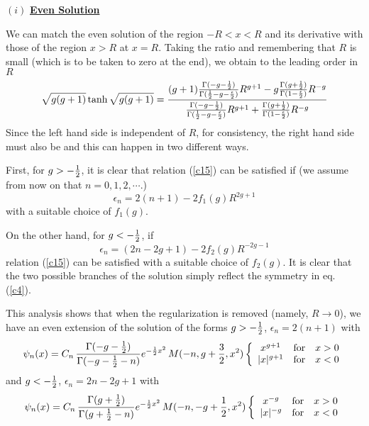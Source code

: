 \documentclass[a4paper,11pt]{article}
\begin{document}
\noindent$(i)$ {\bf\underline{Even Solution}}

We can match the even solution of the region $-R<x<R$ and its
derivative with those of the region $x>R$ at $x=R$. Taking the ratio
and remembering that $R$ is small (which is to be taken to zero at the
end), we obtain to the leading order in $R$
\begin{equation}
\sqrt{g(g+1)}\tanh \sqrt{g(g+1)} =\frac{(g+1){\Gamma(-g-{1\over
2})\over \Gamma({1\over 2}-g-{\epsilon\over
2})}R^{g+1}-g{\Gamma(g+{1\over 2})\over \Gamma(1-{\epsilon\over
2})}R^{-g}}{{\Gamma(-g-{1\over
2})\over \Gamma({1\over 2}-g-{\epsilon\over
2})}R^{g+1}+{\Gamma(g+{1\over 2})\over \Gamma(1-{\epsilon\over
2})}R^{-g}}\label{c15}
\end{equation}
Since the left hand side is independent of $R$, for consistency, the
right hand side must also be and this can happen in two different
ways.

First, for $g>-{1\over 2}$, it is clear that relation (\ref{c15}) can
be satisfied if (we assume from now on that $n=0,1,2,\cdots$.)
\begin{equation}
 \epsilon_{n}  =  2(n+1) -
2f_{1}(g)R^{2g+1}\label{c16}
\end{equation}
with a suitable choice of $f_{1}(g)$.

On the other hand, for $g<-{1\over 2}$, if
\begin{equation}
 \epsilon_{n} =  (2n-2g+1) -
2f_{2}(g)R^{-2g-1}\label{c17}
\end{equation}
relation (\ref{c15}) can be satisfied with a suitable choice of
$f_{2}(g)$. It is clear that the two possible branches of the solution
simply reflect the symmetry in eq. (\ref{c4}).

This analysis shows that when the regularization is removed (namely,
$R\rightarrow 0$), we have an even extension of the solution of the
forms
$g>-{1\over 2}$, $\epsilon_{n} = 2(n+1)$
with
\begin{equation}
\psi_{n}(x) = C_{n}\,\frac{\Gamma(-g-{1\over 2})}{\Gamma(-g-{1\over
2}-n)}e^{-{1\over 2}x^{2}}\,M(-n,g+{3\over
2},x^{2})\left\{\begin{array}{cll}
                x^{g+1}& {\rm for} & x>0\\
                |x|^{g+1}& {\rm for} & x<0
               \end{array}\right.\label{c19}
\end{equation}
and
$g<-{1\over 2}$, $\epsilon_{n} = 2n -2g + 1$
with
\begin{equation}
\psi_{n}(x) = C_{n}\,\frac{\Gamma(g+{1\over 2})}{\Gamma(g+{1\over
2}-n)}e^{-{1\over 2}x^{2}}\,M(-n,-g+{1\over
2},x^{2})\left\{\begin{array}{cll}
                x^{-g}& {\rm for} & x>0\\
                |x|^{-g}& {\rm for} & x<0
               \end{array}\right.\label{c21}
\end{equation}
\end{document}
